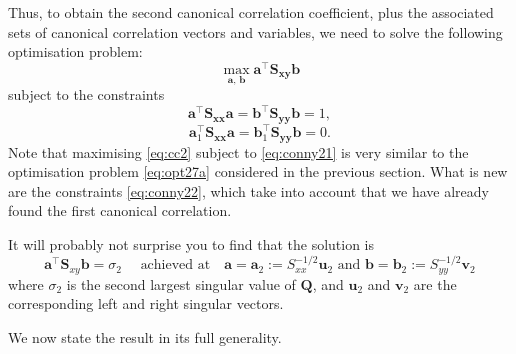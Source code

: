 \documentclass[]{book}
\theoremstyle{definition}
\theoremstyle{definition}
\theoremstyle{definition}
\theoremstyle{remark}
\begin{document}
Thus, to obtain the second canonical correlation coefficient, plus the associated sets of canonical correlation vectors and variables, we need to solve the following optimisation problem:
\begin{equation}
\max_{\boldsymbol a,\, \boldsymbol b} \boldsymbol a^\top \boldsymbol S_{\boldsymbol x\boldsymbol y}\boldsymbol b
\label{eq:cc2}
\end{equation}
subject to the constraints
\begin{equation}
\boldsymbol a^\top \boldsymbol S_{\boldsymbol x\boldsymbol x}\boldsymbol a= \boldsymbol b^\top \boldsymbol S_{\boldsymbol y\boldsymbol y}\boldsymbol b=1,
\label{eq:conny21}
\end{equation}
\begin{equation}
\boldsymbol a_1^\top \boldsymbol S_{\boldsymbol x\boldsymbol x} \boldsymbol a= \boldsymbol b_1^\top \boldsymbol S_{\boldsymbol y\boldsymbol y}\boldsymbol b=0.
\label{eq:conny22}
\end{equation}
Note that maximising \eqref{eq:cc2} subject to \eqref{eq:conny21} is very similar to the optimisation problem \eqref{eq:opt27a} considered in the previous section.
What is
new are the constraints \eqref{eq:conny22}, which take into account that we have already found the first canonical correlation.

It will probably not surprise you to find that the solution is
\[\boldsymbol a^\top \boldsymbol S_{xy}\boldsymbol b= \sigma_2\quad\mbox{ achieved at} \quad \boldsymbol a=\boldsymbol a_2 := S_{xx}^{-1/2}\boldsymbol u_2 \mbox{ and } \boldsymbol b=\boldsymbol b_2 := S_{yy}^{-1/2}\boldsymbol v_2\]
where \(\sigma_2\) is the second largest singular value of \(\boldsymbol Q\), and \(\boldsymbol u_2\) and \(\boldsymbol v_2\) are the corresponding left and right singular vectors.

We now state the result in its full generality.
\end{document}
